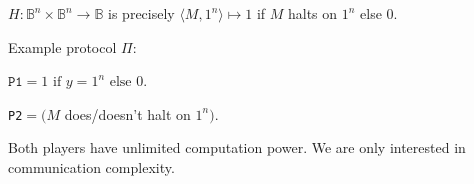 \begin{example}[$A_{TM}$]
\(H : \mathbb{B}^n \times \mathbb{B}^n \to \mathbb{B}\)
is precisely
\(\langle M, 1^{n} \rangle \mapsto 1\)
if $M$ halts on $1^{n}$ else 0.
\end{example}
\pause
Example protocol $\Pi$:\\
\begin{rightbubbles}
{\footnotesize $\texttt{P1}=1 \text{ if } y = 1^{n} \text{ else } 0$.}
\end{rightbubbles}
\pause
\begin{leftbubbles}
\texttt{P2}$=(M$ does/doesn't halt on $1^{n})$.
\end{leftbubbles}
\pause
Both players have unlimited computation power.
We are only interested in communication complexity.